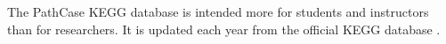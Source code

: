 The PathCase KEGG database is intended more for students and instructors than
for researchers. It is updated each year from the official KEGG database
\cite{enzyme-database} \cite{pathcase-basic}.








